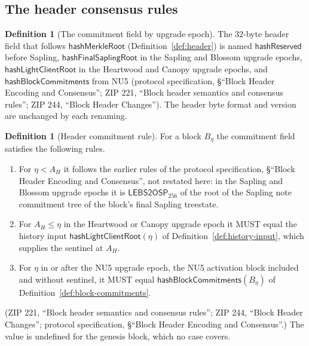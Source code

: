 \documentclass[11pt,a4paper]{article}
\theoremstyle{definition}
\newtheorem{definition}[theorem]{Definition}
\begin{document}
\subsection{The header consensus rules}\label{sec:history-rules}

\begin{definition}[The commitment field by upgrade epoch]
\label{def:commitment-field}
The $32$-byte header field that follows
$\mathsf{hashMerkleRoot}$ (Definition~\ref{def:header}) is named
$\mathsf{hashReserved}$ before Sapling, $\mathsf{hashFinalSaplingRoot}$ in the
Sapling and Blossom upgrade epochs, $\mathsf{hashLightClientRoot}$ in the
Heartwood and Canopy upgrade epochs, and $\mathsf{hashBlockCommitments}$ from
NU5 (protocol specification, \S``Block Header Encoding and Consensus''; ZIP 221,
``Block header semantics and consensus rules''; ZIP 244, ``Block Header
Changes''). The header byte format and version are unchanged by each renaming.
\end{definition}

\begin{definition}[Header commitment rule]\label{def:commitment-rule}
For a block $B_\eta$ the commitment field satisfies the following rules.
\begin{enumerate}[label=(\roman*)]
\item For $\eta < A_H$ it follows the earlier rules of the protocol
  specification, \S``Block Header Encoding and Consensus'', not restated
  here: in the Sapling and Blossom upgrade epochs it is
  $\mathsf{LEBS2OSP}_{256}$ of the root of the Sapling note commitment tree
  of the block's final Sapling treestate.
\item For $A_H \le \eta$ in the Heartwood or Canopy upgrade epoch it MUST
  equal the history input $\mathsf{hashLightClientRoot}(\eta)$ of
  Definition~\ref{def:history-input}, which supplies the sentinel at $A_H$.
\item For $\eta$ in or after the NU5 upgrade epoch, the NU5 activation block
  included and without sentinel, it MUST equal
  $\mathsf{hashBlockCommitments}(B_\eta)$ of
  Definition~\ref{def:block-commitments}.
\end{enumerate}
(ZIP 221, ``Block header semantics and consensus rules''; ZIP 244, ``Block
Header Changes''; protocol specification, \S``Block Header Encoding and
Consensus''.) The value is undefined for the genesis block, which no case
covers.
\end{definition}
\end{document}
